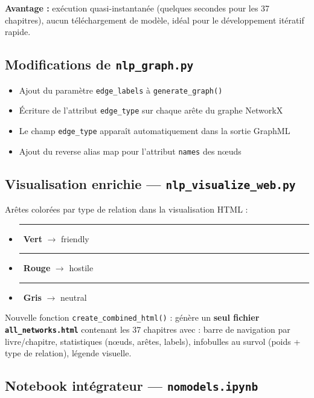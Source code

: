 \documentclass[a4paper,11pt]{article}
\begin{document}
\textbf{Avantage :} exécution quasi-instantanée (quelques secondes pour les 37 chapitres), aucun
téléchargement de modèle, idéal pour le développement itératif rapide.

\subsection{Modifications de \texttt{nlp\_graph.py}}

\begin{itemize}[noitemsep]
  \item Ajout du paramètre \texttt{edge\_labels} à \texttt{generate\_graph()}
  \item Écriture de l'attribut \texttt{edge\_type} sur chaque arête du graphe NetworkX
  \item Le champ \texttt{edge\_type} apparaît automatiquement dans la sortie GraphML
  \item Ajout du reverse alias map pour l'attribut \texttt{names} des nœuds
\end{itemize}

\subsection{Visualisation enrichie — \texttt{nlp\_visualize\_web.py}}

Arêtes colorées par type de relation dans la visualisation HTML :

\begin{itemize}[noitemsep]
  \item \textcolor{friendly}{\rule{9pt}{9pt}}\ \textcolor{friendly}{\textbf{Vert}} $\to$ friendly
  \item \textcolor{hostile}{\rule{9pt}{9pt}}\ \textcolor{hostile}{\textbf{Rouge}} $\to$ hostile
  \item \textcolor{neutral}{\rule{9pt}{9pt}}\ \textcolor{neutral}{\textbf{Gris}} $\to$ neutral
\end{itemize}

Nouvelle fonction \texttt{create\_combined\_html()} : génère un \textbf{seul fichier
\texttt{all\_networks.html}} contenant les 37 chapitres avec :
barre de navigation par livre/chapitre, statistiques (nœuds, arêtes, labels), infobulles au survol
(poids + type de relation), légende visuelle.

\subsection{Notebook intégrateur — \texttt{nomodels.ipynb}}
\end{document}
